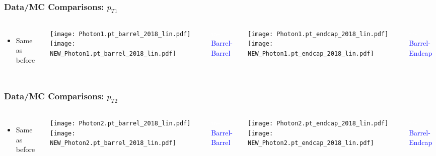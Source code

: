 \documentclass{beamer}
\newcommand\Wider[2][3em]{%
\makebox[\linewidth][c]{%
  \begin{minipage}{\dimexpr\textwidth+#1\relax}
  \raggedright#2
  \end{minipage}%
  }%
}
\begin{document}
\begin{frame}[t]
\frametitle{Data/MC Comparisons: $p_{T1}$}
\begin{columns}[T]
  \begin{itemize}
    \item {\footnotesize \raggedleft Same as before }
  \end{itemize}

\Wider[2.9em]{
\raggedleft
\rotatebox{90}{\parbox{4cm}{\raggedleft \small{\textcolor{blue}{Full 2018 dataset}}}}\\
}
\Wider[3.4em]{
\raggedleft
\rotatebox{90}{\parbox{4cm}{\raggedleft \small{\textcolor{blue}{New 2018 data}}}}
}

\texttt{[image: Photon1.pt\_barrel\_2018\_lin.pdf]}
\texttt{[image: NEW\_Photon1.pt\_barrel\_2018\_lin.pdf]}
\caption{\textcolor{white}{ta-} \textcolor{blue}{\small {Barrel-Barrel}}}

\texttt{[image: Photon1.pt\_endcap\_2018\_lin.pdf]}
\texttt{[image: NEW\_Photon1.pt\_endcap\_2018\_lin.pdf]}
\caption{\textcolor{white}{ta-} \textcolor{blue}{\small {Barrel-Endcap}}}
\end{columns}
\end{frame}

\begin{frame}[t]
\frametitle{Data/MC Comparisons: $p_{T2}$}
\begin{columns}[T]
  \begin{itemize}
    \item {\footnotesize \raggedleft Same as before }
  \end{itemize}

\Wider[2.9em]{
\raggedleft
\rotatebox{90}{\parbox{4cm}{\raggedleft \small{\textcolor{blue}{Full 2018 dataset}}}}\\
}
\Wider[3.4em]{
\raggedleft
\rotatebox{90}{\parbox{4cm}{\raggedleft \small{\textcolor{blue}{New 2018 data}}}}
}

\texttt{[image: Photon2.pt\_barrel\_2018\_lin.pdf]}
\texttt{[image: NEW\_Photon2.pt\_barrel\_2018\_lin.pdf]}
\caption{\textcolor{white}{ta-} \textcolor{blue}{\small {Barrel-Barrel}}}

\texttt{[image: Photon2.pt\_endcap\_2018\_lin.pdf]}
\texttt{[image: NEW\_Photon2.pt\_endcap\_2018\_lin.pdf]}
\caption{\textcolor{white}{ta-} \textcolor{blue}{\small {Barrel-Endcap}}}
\end{columns}
\end{frame}
\end{document}
